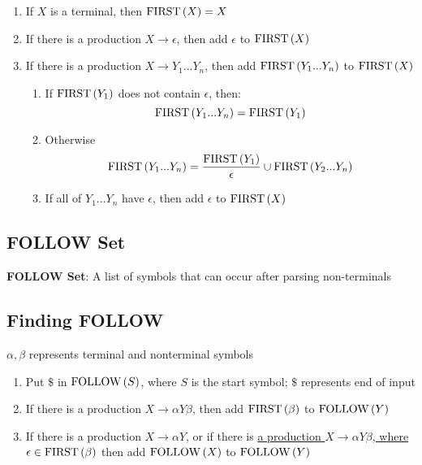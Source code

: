       \begin{enumerate}
        \item If $ X $ is a terminal, then $ \operatorname{FIRST}\left( X \right) = { X } $
        \item If there is a production $ X \to \epsilon $, then add $ \epsilon $
        to $ \operatorname{FIRST}\left( X \right) $
        \item If there is a production $ X \to Y_{1} ... Y_{n} $, then add
        $ \operatorname{FIRST}\left( Y_{1} ... Y_{n} \right) $ to $ \operatorname{FIRST}\left( X \right) $
        \begin{enumerate}
          \item If $ \operatorname{FIRST}\left( Y_{1} \right) $ does not contain $ \epsilon $,
          then:
          \begin{equation}
            \operatorname{FIRST}\left( Y_{1} ... Y_{n} \right) = \operatorname{FIRST}\left( Y_{1} \right)
          \end{equation}

          \item Otherwise
          \begin{equation}
            \operatorname{FIRST}\left( Y_{1} ... Y_{n} \right) =
              \frac{\operatorname{FIRST}\left( Y_{1} \right)}{\epsilon} \cup
              \operatorname{FIRST}\left( Y_{2} ... Y_{n} \right)
          \end{equation}

          \item If all of $ Y_{1} ... Y_{n} $ have $ \epsilon $, then add
          $ \epsilon $ to $ \operatorname{FIRST}\left( X \right) $
        \end{enumerate}
      \end{enumerate}

  \subsection{FOLLOW Set}

    \begin{definition}
      \textbf{FOLLOW Set}: A list of symbols that can occur after parsing
      non-terminals
    \end{definition}

    \subsection{Finding FOLLOW}

      $ \alpha, \beta $ represents terminal and nonterminal symbols

      \begin{enumerate}
        \item Put $ \$ $ in $ \operatorname{FOLLOW}\left( S \right) $, where $ S $ is the start
        symbol; $ \$ $ represents end of input
        \item If there is a production $ X \to \alpha Y \beta $, then add
        $ \operatorname{FIRST}\left( \beta \right) $ to $ \operatorname{FOLLOW}\left( Y \right) $
        \item If there is a production $ X \to \alpha Y $, or if there is \ul{a
        production $ X \to \alpha Y \beta $, where
        $ \epsilon \in \operatorname{FIRST}\left( \beta \right) $} then add
        $ \operatorname{FOLLOW}\left( X \right) $ to $ \operatorname{FOLLOW}\left( Y \right) $
      \end{enumerate}

